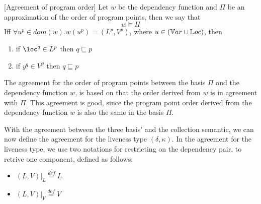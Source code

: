 \documentclass[../../master.tex]{subfiles}
\begin{document}

\begin{definition}{[Agreement of program order]}
	Let $w$ be the dependency function and $\Pi$ be an approximation of the order of program points, then we say that
	$$w\models\Pi$$
	Iff $\forall u^p\in dom(w).w(u^p)=(L^p,V^p)$, where $u\in(\mathbb{V}ar\cup\mathbb{L}oc)$, then
	\begin{enumerate}
		\item if $\loc^q\in L^p$ then $q\sqsubseteq p$
		\item if $y^q\in V^p$ then $q\sqsubseteq p$
	\end{enumerate}
	\iffalse
	\begin{itemize}
		\item $(p,q)\in\Pi \Rightarrow \exists x,y. x^p\in dom(w) \wedge y^q\in dom(w)$
		\item $w(u^p)=(L^p,V^p)$, where $u\in\Var\cup\Loc)$, then
		\begin{enumerate}
			\item if $\loc^q\in L^p$ then $q\sqsubseteq p$
			\item if $y^q\in V^p$ then $q\sqsubseteq p$
		\end{enumerate}
	\end{itemize}
	\fi
\end{definition}

The agreement for the order of program points between the basis $\Pi$ and the dependency function $w$, is based on that the order derived from $w$ is in agreement with $\Pi$.
This agreement is good, since the program point order derived from the dependency function $w$ is also the same in the basis $\Pi$.
\bigskip

With the agreement between the three basis' and the collection semantic, we can now define the agreement for the liveness type $(\delta,\kappa)$.
In the agreement for the liveness type, we use two notations for restricting on the dependency pair, to retrive one component, defined as follows:
\begin{itemize}
	\item $(L,V)|_L \overset{def}{=} L$
	\item $(L,V)|_V \overset{def}{=} V$
\end{itemize}
\end{document}
